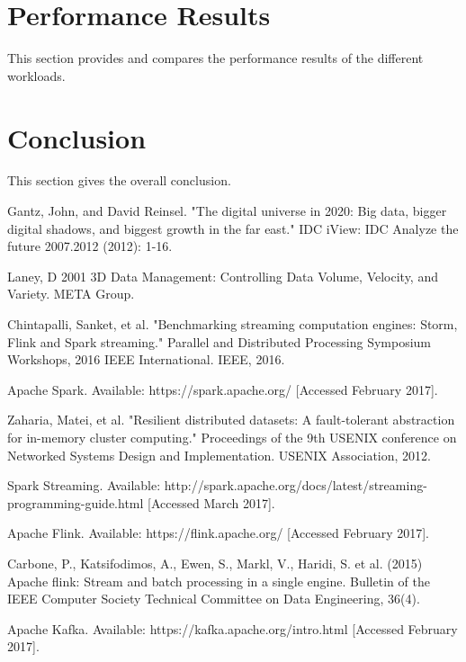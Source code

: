 \documentclass[]{article}
\begin{document}
\section{Performance Results}

This section provides and compares the performance results of the different workloads.

\section{Conclusion}
This section gives the overall conclusion.


\begin{thebibliography}{[MT1]}
%
Gantz, John, and David Reinsel. "The digital universe in 2020: Big data, bigger digital shadows, and biggest growth in the far east." IDC iView: IDC Analyze the future 2007.2012 (2012): 1-16.

Laney, D 2001 3D Data Management: Controlling Data Volume, Velocity, and Variety. META Group.

Chintapalli, Sanket, et al. "Benchmarking streaming computation engines: Storm, Flink and Spark streaming." Parallel and Distributed Processing Symposium Workshops, 2016 IEEE International. IEEE, 2016.

Apache Spark. Available: https://spark.apache.org/ [Accessed February 2017].

Zaharia, Matei, et al. "Resilient distributed datasets: A fault-tolerant abstraction for in-memory cluster computing." Proceedings of the 9th USENIX conference on Networked Systems Design and Implementation. USENIX Association, 2012.

Spark Streaming. Available: http://spark.apache.org/docs/latest/streaming-programming-guide.html [Accessed March 2017].

Apache Flink. Available: https://flink.apache.org/ [Accessed February 2017].

Carbone, P., Katsifodimos, A., Ewen, S., Markl, V., Haridi, S. et al. (2015)
Apache flink: Stream and batch processing in a single engine.
Bulletin of the IEEE Computer Society Technical Committee on Data Engineering, 36(4).

Apache Kafka. Available: https://kafka.apache.org/intro.html [Accessed February 2017].


%
\end{thebibliography}
\end{document}
